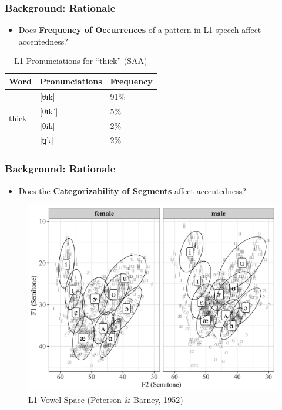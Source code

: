\documentclass{beamer}
\begin{document}
\begin{frame}
\frametitle{Background: Rationale}
\begin{itemize} 
\item Does \textbf{Frequency of Occurrences }of a pattern in L1 speech affect accentedness? \linebreak 
\end{itemize}
\begin{table}[h!]
\begin{tabular}{lll}
Word                   & Pronunciations & Frequency \\
			\hline
\multirow{4}{*}{thick} & {[}θɪk{]}      & 91\%      \\
                       & {[}θɪk˺{]}     & 5\%       \\
                       & {[}θik{]}      & 2\%       \\
                       & {[}t̪ɪk{]}     & 2\%      \\
                       \hline
\end{tabular}
\caption{L1 Pronunciations for “thick” (SAA)}
\end{table}

\end{frame}

\begin{frame}
\frametitle{Background: Rationale}
\begin{itemize} 
\item Does the \textbf{Categorizability of Segments} affect accentedness?\linebreak 
\end{itemize}
\begin{figure}
\includegraphics[width=0.6\linewidth]{figures/nativeVowel}
\caption{L1 Vowel Space (Peterson \& Barney, 1952)}
\end{figure}

\end{frame}
\end{document}
